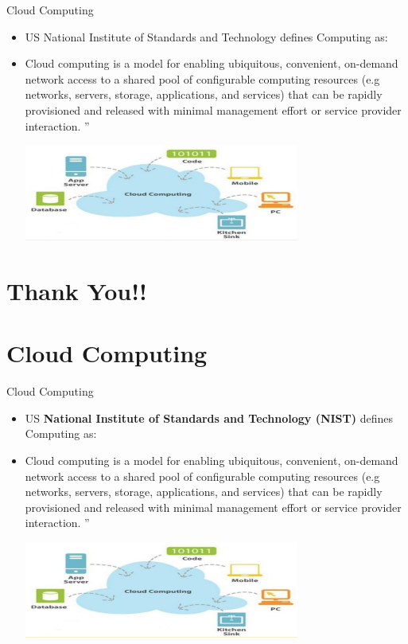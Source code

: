 \documentclass{SKP-beamer}
\begin{document}
\begin{frame}{Cloud Computing}
	\begin{itemize}
		\item US National Institute of Standards and Technology defines Computing as:
		\item Cloud computing is a model for enabling ubiquitous, convenient, on-demand network access to a shared pool of 
		configurable computing resources (e.g networks, servers, storage, applications, and services) that can be 
		rapidly provisioned and released with minimal management effort or service provider interaction. ”
		
		\includegraphics[scale=1.5]{11.png}
		
	\end{itemize}
\end{frame}

\section{\textbf{Thank You!!}}

\section{\textbf{Cloud Computing}}



\begin{frame}{Cloud Computing}
	\begin{itemize}
		\item US \textbf{National Institute of Standards and Technology (NIST)} defines Computing as:
		\item Cloud computing is a model for enabling ubiquitous, convenient, on-demand network access to a shared pool of 
		configurable computing resources (e.g networks, servers, storage, applications, and services) that can be 
		rapidly provisioned and released with minimal management effort or service provider interaction. ”
		
		\includegraphics[scale=1.5]{11.png}
		
	\end{itemize}
\end{frame}
\end{document}
